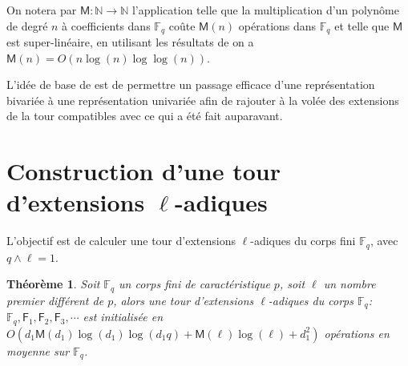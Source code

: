 \documentclass[10pt,a4paper]{book}
\theoremstyle{plain}
\newtheorem{thm}{Théorème}[chapter]
\theoremstyle{definition}
\theoremstyle{definition}
\theoremstyle{definition}
\theoremstyle{definition}
\theoremstyle{remark}
\theoremstyle{remark}
\theoremstyle{definition}
\begin{document}
On notera par $\mathsf{M}: \mathbb{N} \rightarrow \mathbb{N}$ l'application telle que la multiplication d'un polynôme de degré $n$ à coefficients dans $\mathbb{F}_q$ coûte $\mathsf{M}(n)$ opérations dans $\mathbb{F}_q$ et telle que $\mathsf{M}$ est super-linéaire, en utilisant les résultats de \cite{Cantor-Kaltofen91} on a $\mathsf{M}(n)=O(n\log(n) \log \log(n))$. 

L'idée de base de \cite{Doliskani-Schost15} est de permettre un passage efficace d'une représentation bivariée à une représentation univariée afin de rajouter à la volée des extensions de la tour compatibles avec ce qui a été fait auparavant.

\section{Construction d'une tour d'extensions $\ell$-adiques}
L'objectif est de calculer une tour d'extensions $\ell$-adiques du corps fini $\mathbb{F}_q$, avec $q \wedge \ell =1$. 

\begin{thm}
\label{thm:init:tow}
Soit $\mathbb{F}_q$ un corps fini de caractéristique $p$, soit $\ell$ un nombre premier différent de $p$,  alors une tour d'extensions $\ell$-adiques du corps $\mathbb{F}_q$: $\mathbb{F}_q, \mathsf{F}_1, \mathsf{F}_2, \mathsf{F}_3, \cdots$ est initialisée en $O(d_1\mathsf{M}(d_1)\log(d_1)\log(d_1q)+\mathsf{M}(\ell)\log(\ell)+d_1^2)$ opérations en moyenne sur $\mathbb{F}_q$.
\end{thm}
 
\end{document}
